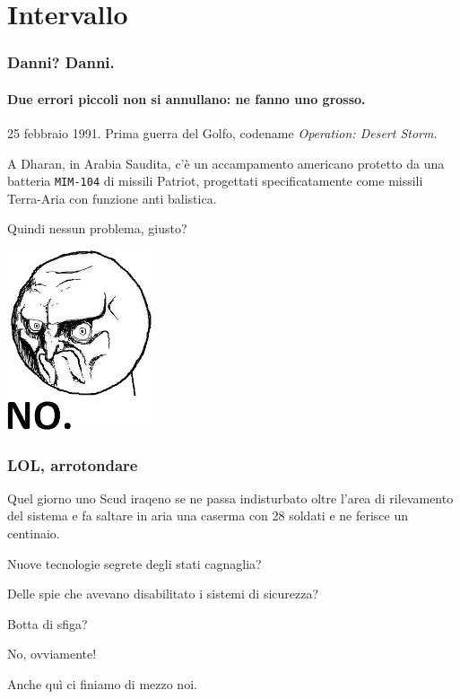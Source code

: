 \documentclass{beamer}
\begin{document}
  \section{Intervallo}
	  \begin{frame}
	    \frametitle{Danni? Danni.}
	    \framesubtitle{Due errori piccoli non si annullano: ne fanno uno grosso.}
	    25 febbraio 1991. Prima guerra del Golfo, codename \emph{Operation: Desert Storm}.
	    
			\vspace{2em}	    
	    
	    A Dharan, in Arabia Saudita, c'è un accampamento americano protetto da una batteria \texttt{MIM-104} di
	    missili Patriot, progettati specificatamente come missili Terra-Aria con funzione
	    anti balistica.
	    
	    Quindi nessun problema, giusto?
	    
	    \pause
	    
	    \begin{center}
		    		\includegraphics[width=.2\textwidth]{IMGs/no.jpg}
		    \end{center}
	    
	  \end{frame}
	  
	  \begin{frame}
	  		\frametitle{LOL, arrotondare}
	  	    
	    Quel giorno uno Scud iraqeno se ne passa indisturbato oltre l'area di rilevamento del sistema
	    e fa saltare in aria una caserma con 28 soldati e ne ferisce un centinaio.
	    
	    \vspace{2em}
	    \pause
	    
	    Nuove tecnologie segrete degli stati cagnaglia?
	    
	    \pause
	    
	    Delle spie che avevano disabilitato i sistemi di sicurezza?
	    
	    \pause
	    
	    Botta di sfiga?
	    
	    \pause
	    
	    \vspace{2em}
	    
	    No, ovviamente!
	    
	    Anche quì ci finiamo di mezzo noi.
	    
	  \end{frame}
	  
\end{document}
